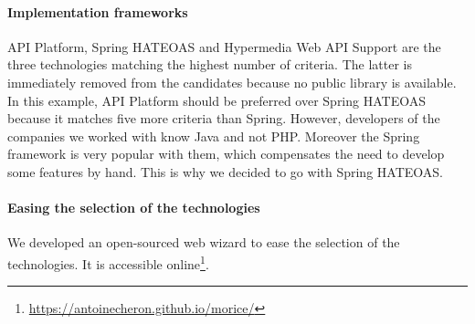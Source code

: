 \paragraph{Implementation frameworks}
API Platform, Spring HATEOAS and Hypermedia Web API Support \cite{salvadori2014framework} are the three technologies matching the highest number of criteria. The latter is immediately removed from the candidates because no public library is available. In this example, API Platform should be preferred over Spring HATEOAS because it matches five more criteria than Spring. However, developers of the companies we worked with know Java and not PHP. Moreover the Spring framework is very popular with them, which compensates the need to develop some features by hand. This is why we decided to go with Spring HATEOAS.

\paragraph{Easing the selection of the technologies}


We developed an open-sourced web wizard to ease the selection of the technologies. It is accessible online\footnote{\url{https://antoinecheron.github.io/morice/}}.

